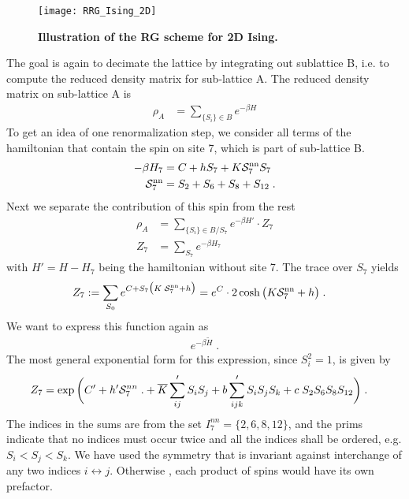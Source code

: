 %
\begin{figure}[htbp]
\begin{center}
\texttt{[image: RRG\_Ising\_2D]}
\caption{\bf Illustration of the RG scheme for 2D Ising. 
}
\label{fig:rng:ising:2d} 
\end{center}
\end{figure}
%
The goal is again to decimate the lattice by integrating out sublattice B, i.e.
to compute the reduced density matrix for sub-lattice A.
The reduced density matrix on sub-lattice A is
%
\begin{align*}
\rho_{A} &= \sum_{\{S_{i}\}\in B} e^{-\beta H}
\end{align*}
%
To get an idea of one renormalization step,
we consider all terms of the hamiltonian that contain the spin on site 7, which is part of sub-lattice B.
%
\newcommand{\Snn}{{\cal S}^\text{nn}_{7}}
\newcommand{\Snnn}{{\cal S}^\text{nnn}_{7}}
\begin{align*}
-\beta H_{7} &= C + h S_{7} + K \Snn S_{7 }\\
\Snn &= S_{2} + S_{6} + S_{8} + S_{12}\;.
\end{align*}
%
Next we separate the contribution of this spin from the rest
%
\begin{align*}
\rho_{A} &= \sum_{\{S_{i}\}\in B / S_{7}} e^{-\beta H'} \cdot Z_{7}\\
Z_{7} &= \sum_{S_{7}} e^{-\beta H_{7}}
\end{align*}
% 
with $H'=H-H_{7}$ being the hamiltonian without site 7.
The trace over $S_{7}$ yields
%
\begin{align}\label{eq:Z:7a}
Z_{7}:=
\sum_{S_{0}} e^{C + S_{7}\big( K \;\Snn +h\big) }
&= e^{C} \cdot 2\cosh\big(K \Snn  +h  \big)\;.
\end{align}
%
We want to express this function again as
%
\begin{align*}
e^{- \beta \tilde H}\;.
\end{align*}
%
The most general exponential form for this expression, since $S_{i}^{2}=1$, is given by
%
\begin{align}\label{eq:Z7}
Z_{7}&= \exp\bigg(C' + h' {\cal S}_{7}	^{nn}\;.
+ \overline{K} \sum'_{ij}  S_{i}S_{j}  +
b \sum'_{ijk} S_{i}S_{j} S_{k}  + c \; S_{2}S_{6}S_{8}S_{12}\bigg)\;.
\end{align}
%
The indices in the sums are from the set $I^{nn}_{7} =\{2,6,8,12\}$,
and the prims indicate that  no indices must occur twice and all the indices shall be ordered, e.g. $S_{i}<S_{j}<S_{k}$. 
We have used the symmetry that 
is invariant against interchange of any two indices $i\leftrightarrow j$.
Otherwise , each product of spins would have its own prefactor.

